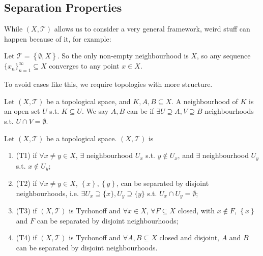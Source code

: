 \subsection{Separation Properties}

While $(X, \mathcal{T})$ allows us to consider a very general framework, weird stuff can happen 
because of it, for example: 

\begin{exmp}
    Let $\mathcal{T} = \left\{ \emptyset, X \right\}$. So the only non-empty neighbourhood is $X$,
    so any sequence $\{x_{n}\}_{n=1}^{\infty} \subseteq X$ converges to any point $x \in X$.
   
\end{exmp} 

\noindent To avoid cases like this, we require topologies with more structure. 

\begin{defn}
    Let $(X, \mathcal{T})$ be a topological space, and $K, A, B \subseteq X$. A neighbourhood of $K$
    is an open set $U$ s.t. $K \subseteq U$. We say $A, B$ can be  
    if $\exists U \supseteq A, V \supseteq B$ neighbourhoods s.t. $U \cap V = \emptyset$.
\end{defn}

\begin{defn} 
    Let $(X, \mathcal{T})$ be a topological space. $(X, \mathcal{T})$ is
    \begin{enumerate}
        \item {} (T1) if $\forall x \neq y \in X$, $\exists $ neighbourhood $U_x$ s.t. 
        $y \notin U_x$, and $\exists $ neighbourhood $U_y$ s.t. $x \notin U_y$;
        \item {} (T2) if $\forall x \neq y \in X$, $\left\{ x \right\}, \left\{ y \right\} $,
        can be separated by disjoint neighbourhoods, i.e. $\exists U_x \supseteq \{x\}, U_y \supseteq \{y\}$
        s.t. $U_x \cap U_y = \emptyset$;
        \item {} (T3) if $(X, \mathcal{T})$ is Tychonoff and $\forall x \in X$, $\forall F \subseteq
        X$ closed, with $x \notin F$, $\left\{ x \right\} $ and $F$ can be separated by disjoint
        neighbourhoods;
        \item {} (T4) if $(X, \mathcal{T})$ is Tychonoff and $\forall A, B \subseteq X$ closed and
        disjoint, $A$ and $B$ can be separated by disjoint neighbourhoods.           
    \end{enumerate}  
\end{defn}


